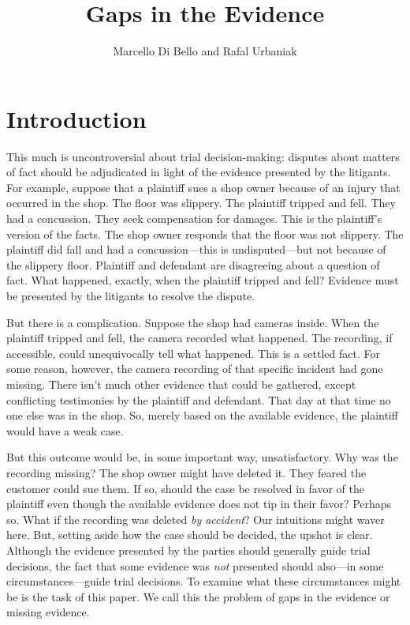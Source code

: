 \documentclass[
  10pt,
  dvipsnames,enabledeprecatedfontcommands]{scrartcl}
\title{Gaps in the Evidence}
\author{Marcello Di Bello and Rafal Urbaniak}
\date{}
\begin{document}
\maketitle

\tableofcontents

\hypertarget{introduction}{%
\section{Introduction}\label{introduction}}

This much is uncontroversial about trial decision-making: disputes about
matters of fact should be adjudicated in light of the evidence presented
by the litigants. For example, suppose that a plaintiff sues a shop
owner because of an injury that occurred in the shop. The floor was
slippery. The plaintiff tripped and fell. They had a concussion. They
seek compensation for damages. This is the plaintiff's version of the
facts. The shop owner responds that the floor was not slippery. The
plaintiff did fall and had a concussion---this is undisputed---but not
because of the slippery floor. Plaintiff and defendant are disagreeing
about a question of fact. What happened, exactly, when the plaintiff
tripped and fell? Evidence must be presented by the litigants to resolve
the dispute.

But there is a complication. Suppose the shop had cameras inside. When
the plaintiff tripped and fell, the camera recorded what happened. The
recording, if accessible, could unequivocally tell what happened. This
is a settled fact. For some reason, however, the camera recording of
that specific incident had gone missing. There isn't much other evidence
that could be gathered, except conflicting testimonies by the plaintiff
and defendant. That day at that time no one else was in the shop. So,
merely based on the available evidence, the plaintiff would have a weak
case.

But this outcome would be, in some important way, unsatisfactory. Why
was the recording missing? The shop owner might have deleted it. They
feared the customer could sue them. If so, should the case be resolved
in favor of the plaintiff even though the available evidence does not
tip in their favor? Perhaps so. What if the recording was deleted
\emph{by accident}? Our intuitions might waver here. But, setting aside
how the case should be decided, the upshot is clear. Although the
evidence presented by the parties should generally guide trial
decisions, the fact that some evidence was \textit{not} presented should
also---in some circumstances---guide trial decisions. To examine what
these circumstances might be is the task of this paper. We call this the
problem of gaps in the evidence or missing evidence.
\end{document}
